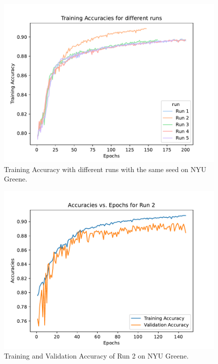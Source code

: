 \documentclass[sigplan,screen]{acmart}
\begin{document}
\begin{figure}[htb]
\centering\includegraphics[width=1.0\columnwidth]{images/training_accuracy_diff_runs.pdf}
\caption{Training Accuracy with different runs with the same seed on NYU Greene.}
\label{fig:Training Accuracy}
\end{figure}

\begin{figure}[ht]
\centering\includegraphics[width=1.0\columnwidth]{images/epoch_vs_accuracy (2).pdf}
\caption{Training and Validation Accuracy of Run 2 on NYU Greene.}
\label{fig:Accuracies of Run 2}
\end{figure}
\end{document}
